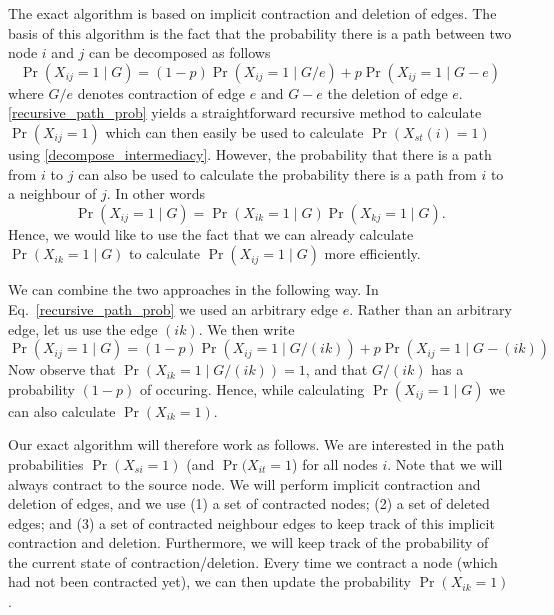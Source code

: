 
The exact algorithm is based on implicit contraction and deletion of edges.
The basis of this algorithm is the fact that the probability there is a path between two node $i$ and $j$ can be decomposed as follows
\begin{equation}
	\Pr(X_{ij} = 1 \mid G) = (1 - p) \Pr(X_{ij} = 1 \mid G/e) + p \Pr(X_{ij} = 1 \mid G - e)
\label{eq:recursive_path_prob}
\end{equation}
where $G/e$ denotes contraction of edge $e$ and $G - e$ the deletion of edge $e$.
\eqref{recursive_path_prob} yields a straightforward recursive method to calculate $\Pr(X_{ij} = 1)$ which can then easily be used to calculate $\Pr(X_{st}(i) = 1)$ using \eqref{decompose_intermediacy}.
However, the probability that there is a path from $i$ to $j$ can also be used to calculate the probability there is a path from $i$ to a neighbour of $j$.
In other words
\begin{equation}
	\Pr(X_{ij} = 1 \mid G) = \Pr(X_{ik} = 1 \mid G) \Pr(X_{kj} = 1 \mid G).
	\label{eq:decompose_path_prob}
\end{equation}
Hence, we would like to use the fact that we can already calculate $\Pr(X_{ik} = 1 \mid G)$ to calculate $\Pr(X_{ij} = 1 \mid G)$ more efficiently.

We can combine the two approaches in the following way.
In Eq.~\eqref{recursive_path_prob} we used an arbitrary edge $e$.
Rather than an arbitrary edge, let us use the edge $(ik)$.
We then write
\begin{equation}
	\Pr(X_{ij} = 1 \mid G) = (1 - p) \Pr(X_{ij} = 1 \mid G/(ik)) + p \Pr(X_{ij} = 1 \mid G - (ik))
\end{equation}
Now observe that $\Pr(X_{ik} = 1 \mid G/(ik)) = 1$, and that $G/(ik)$ has a probability $(1 - p)$ of occuring.
Hence, while calculating $\Pr(X_{ij} = 1 \mid G)$ we can also calculate $\Pr(X_{ik} = 1)$.

Our exact algorithm will therefore work as follows.
We are interested in the path probabilities $\Pr(X_{si} = 1)$ (and $\Pr(X_{it} = 1$) for all nodes $i$.
Note that we will always contract to the source node.
We will perform implicit contraction and deletion of edges, and we use (1) a set of contracted nodes; (2) a set of deleted edges; and (3) a set of contracted neighbour edges to keep track of this implicit contraction and deletion.
Furthermore, we will keep track of the probability of the current state of contraction/deletion.
Every time we contract a node (which had not been contracted yet), we can then update the probability $\Pr(X_{ik} = 1)$.

